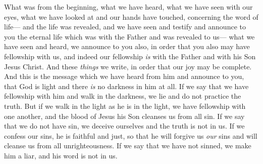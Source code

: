 
\begin{biblechapter} %
 What was from the beginning, what we have heard, what we have seen with our eyes, what we have looked at and our hands have touched, concerning the word of life—
\verse and the life was revealed, and we have seen and testify and announce to you the eternal life which was with the Father and was revealed to us—
\verse what we have seen and heard, we announce to you also, in order that you also may have fellowship with us, and indeed our fellowship \textit{is} with the Father and with his Son Jesus Christ.
\verse And these \textit{things} we write, in order that our joy may be complete.
 And this is the message which we have heard from him and announce to you, that God is light and there \textit{is} no darkness in him at all.
\verse If we say that we have fellowship with him and walk in the darkness, we lie and do not practice the truth.
\verse But if we walk in the light as he is in the light, we have fellowship with one another, and the blood of Jesus his Son cleanses us from all sin.
\verse If we say that we do not have sin, we deceive ourselves and the truth is not in us.
\verse If we confess our sins, he is faithful and just, so that he will forgive us \textit{our} sins and will cleanse us from all unrighteousness.
\verse If we say that we have not sinned, we make him a liar, and his word is not in us.
\end{biblechapter}

